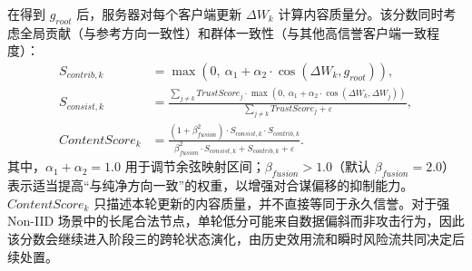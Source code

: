 \documentclass[11pt, a4paper, UTF8, fontset=fandol]{ctexart}
\begin{document}
在得到 $g_{root}$ 后，服务器对每个客户端更新 $\Delta W_k$ 计算内容质量分。该分数同时考虑全局贡献（与参考方向一致性）和群体一致性（与其他高信誉客户端一致程度）：
\begin{align}
    S_{contrib,k}    & = \max\left(0,\ \alpha_{1} + \alpha_{2} \cdot \cos(\Delta W_{k}, g_{root})\right),                                                                                             \\
    S_{consist,k}    & = \frac{\sum_{j\neq k} TrustScore_{j} \cdot \max\left(0,\ \alpha_{1} + \alpha_{2} \cdot \cos(\Delta W_{k}, \Delta W_{j})\right)}{\sum_{j\neq k} TrustScore_{j} + \varepsilon}, \\
    ContentScore_{k} & = \frac{(1 + \beta_{fusion}^{2}) \cdot S_{consist,k} \cdot S_{contrib,k}}{\beta_{fusion}^{2}\cdot S_{consist,k} + S_{contrib,k} + \varepsilon}.
\end{align}
其中，$\alpha_1+\alpha_2=1.0$ 用于调节余弦映射区间；$\beta_{fusion}>1.0$（默认 $\beta_{fusion}=2.0$）表示适当提高“与纯净方向一致”的权重，以增强对合谋偏移的抑制能力。$ContentScore_k$ 只描述本轮更新的内容质量，并不直接等同于永久信誉。对于强 Non-IID 场景中的长尾合法节点，单轮低分可能来自数据偏斜而非攻击行为，因此该分数会继续进入阶段三的跨轮状态演化，由历史效用流和瞬时风险流共同决定后续处置。
\end{document}

